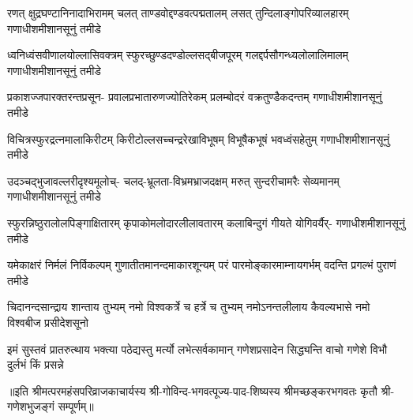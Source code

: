 

\fourlineindentedshloka
{रणत् क्षुद्रघण्टानिनादाभिरामम्}
{चलत् ताण्डवोद्दण्डवत्पद्मतालम्}
{लसत् तुन्दिलाङ्गोपरिव्यालहारम्}
{गणाधीशमीशानसूनुं तमीडे}%

\fourlineindentedshloka
{ध्वनिध्वंसवीणालयोल्लासिवक्त्रम्}
{स्फुरच्छुण्डदण्डोल्लसद्‌बीजपूरम्}
{गलद्दर्पसौगन्ध्यलोलालिमालम्}
{गणाधीशमीशानसूनुं तमीडे}%

\fourlineindentedshloka
{प्रकाशज्जपारक्तरन्तप्रसून-}
{प्रवालप्रभातारुणज्योतिरेकम्}
{प्रलम्बोदरं वक्रतुण्डैकदन्तम्}
{गणाधीशमीशानसूनुं तमीडे}%

\fourlineindentedshloka
{विचित्रस्फुरद्रत्नमालाकिरीटम्}
{किरीटोल्लसच्चन्द्ररेखाविभूषम्}
{विभूषैकभूषं भवध्वंसहेतुम्}
{गणाधीशमीशानसूनुं तमीडे}%

\fourlineindentedshloka
{उदञ्चद्भुजावल्लरीदृश्यमूलोच्-}
{चलद्‌-भ्रूलता-विभ्रमभ्राजदक्षम्}
{मरुत् सुन्दरीचामरैः सेव्यमानम्}
{गणाधीशमीशानसूनुं तमीडे}%

\fourlineindentedshloka
{स्फुरन्निष्ठुरालोलपिङ्गाक्षितारम्}
{कृपाकोमलोदारलीलावतारम्}
{कलाबिन्दुगं गीयते योगिवर्यैर्-}
{गणाधीशमीशानसूनुं तमीडे}%

\fourlineindentedshloka
{यमेकाक्षरं निर्मलं निर्विकल्पम्}
{गुणातीतमानन्दमाकारशून्यम्}
{परं पारमोङ्कारमाम्नायगर्भम्}
{वदन्ति प्रगल्भं पुराणं तमीडे}%

\fourlineindentedshloka
{चिदानन्दसान्द्राय शान्ताय तुभ्यम्}
{नमो विश्वकर्त्रे च हर्त्रे च तुभ्यम्}
{नमोऽनन्तलीलाय कैवल्यभासे}
{नमो विश्वबीज प्रसीदेशसूनो}%

\fourlineindentedshloka
{इमं सुस्तवं प्रातरुत्थाय भक्त्या}
{पठेद्यस्तु मर्त्यो लभेत्सर्वकामान्}
{गणेशप्रसादेन सिद्ध्यन्ति वाचो}
{गणेशे विभौ दुर्लभं किं प्रसन्ने}%

॥इति श्रीमत्परमहंसपरिव्राजकाचार्यस्य श्री-गोविन्द-भगवत्पूज्य-पाद-शिष्यस्य 
श्रीमच्छङ्करभगवतः कृतौ श्री-गणेशभुजङ्गं सम्पूर्णम्॥
